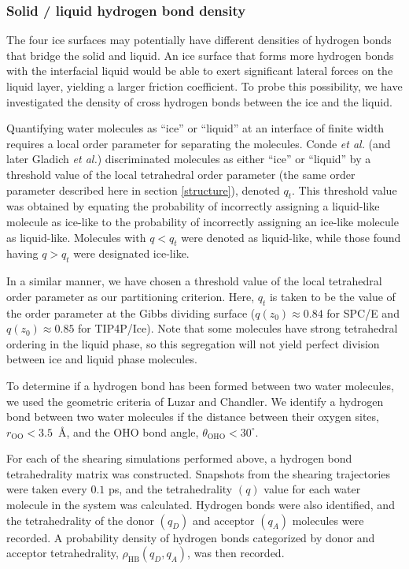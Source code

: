 \subsubsection{Solid / liquid hydrogen bond density}
The four ice surfaces may potentially have different densities of
hydrogen bonds that bridge the solid and liquid. An ice surface that
forms more hydrogen bonds with the interfacial liquid would be able to
exert significant lateral forces on the liquid layer, yielding a
larger friction coefficient. To probe this possibility, we have
investigated the density of cross hydrogen bonds between the ice and
the liquid.

Quantifying water molecules as ``ice'' or ``liquid'' at an interface
of finite width requires a local order parameter for separating the
molecules.  Conde \textit{et al.}\cite{Conde2008} (and later Gladich
\textit{et al.}\cite{Gladich2011,Gladich2015}) discriminated molecules
as either ``ice'' or ``liquid'' by a threshold value of the local
tetrahedral order parameter (the same order parameter described here
in section \ref{structure}), denoted $q_{t}$. This threshold value was
obtained by equating the probability of incorrectly assigning a
liquid-like molecule as ice-like to the probability of incorrectly
assigning an ice-like molecule as liquid-like. Molecules with
$q < q_{t}$ were denoted as liquid-like, while those found having
$q > q_{t}$ were designated ice-like.

In a similar manner, we have chosen a threshold value of the local
tetrahedral order parameter as our partitioning criterion. Here,
$q_{t}$ is taken to be the value of the order parameter at the Gibbs
dividing surface ($q(z_0) \approx 0.84$ for SPC/E and
$q(z_0) \approx 0.85$ for TIP4P/Ice).  Note that some molecules have
strong tetrahedral ordering in the liquid phase, so this segregation
will not yield perfect division between ice and liquid phase
molecules.

To determine if a hydrogen bond has been formed between two water
molecules, we used the geometric criteria of Luzar and
Chandler.\cite{Luzar1996} We identify a hydrogen bond between two
water molecules if the distance between their oxygen sites,
$r_\mathrm{OO} < 3.5$~\AA, and the OHO bond angle,
$\theta_\mathrm{OHO} < 30^\circ$.

For each of the shearing simulations performed above, a hydrogen bond
tetrahedrality matrix was constructed.  Snapshots from the shearing
trajectories were taken every $0.1$ ps, and the tetrahedrality $(q)$
value for each water molecule in the system was calculated. Hydrogen
bonds were also identified, and the tetrahedrality of the donor
$(q_{D})$ and acceptor $(q_{A})$ molecules were recorded. A
probability density of hydrogen bonds categorized by donor and
acceptor tetrahedrality, $\rho_\mathrm{HB}(q_D, q_A)$, was then
recorded.

